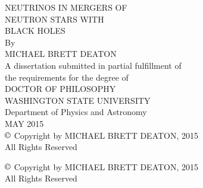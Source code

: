 \documentclass[12pt]{report}
\begin{document}

\begin{titlepage}
  \begin{singlespace}
    \begin{center}
      {\uppercase{
          Neutrinos in Mergers of\\
          Neutron Stars with\\
          Black Holes}}\\
      \vspace{1.63in}
      By\\
      \bigskip
      \uppercase{Michael Brett Deaton}\\
      \vspace{2.65in}
      A dissertation submitted in partial fulfillment of\\
      the requirements for the degree of\\
      \bigskip
      \uppercase{Doctor of Philosophy}\\
      \bigskip \bigskip \bigskip
      \uppercase{Washington State University}\\
      Department of Physics and Astronomy\\
      \bigskip
      \uppercase{May 2015}\\
      \bigskip \bigskip
      $\copyright$ Copyright by MICHAEL BRETT DEATON, 2015\\
      All Rights Reserved
    \end{center}
  \end{singlespace}
\end{titlepage}
\newpage

\thispagestyle{empty} %
\begin{center}
  \begin{singlespace}
    \null %
    \vfill
    $\copyright$ Copyright by \uppercase{Michael Brett Deaton}, 2015\\
    All Rights Reserved
  \end{singlespace}
\end{center}
\newpage
\end{document}
